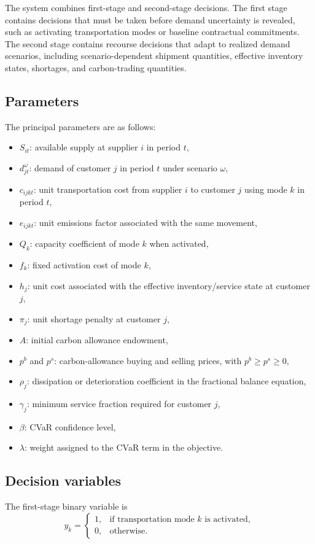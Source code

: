 The system combines first-stage and second-stage decisions. The first stage contains decisions that must be taken before demand uncertainty is revealed, such as activating transportation modes or baseline contractual commitments. The second stage contains recourse decisions that adapt to realized demand scenarios, including scenario-dependent shipment quantities, effective inventory states, shortages, and carbon-trading quantities.

\subsection{Parameters}
The principal parameters are as follows:
\begin{itemize}[leftmargin=1.8em]
    \item $S_{it}$: available supply at supplier $i$ in period $t$,
    \item $d_{jt}^{\omega}$: demand of customer $j$ in period $t$ under scenario $\omega$,
    \item $c_{ijkt}$: unit transportation cost from supplier $i$ to customer $j$ using mode $k$ in period $t$,
    \item $e_{ijkt}$: unit emissions factor associated with the same movement,
    \item $Q_k$: capacity coefficient of mode $k$ when activated,
    \item $f_k$: fixed activation cost of mode $k$,
    \item $h_j$: unit cost associated with the effective inventory/service state at customer $j$,
    \item $\pi_j$: unit shortage penalty at customer $j$,
    \item $A$: initial carbon allowance endowment,
    \item $p^b$ and $p^s$: carbon-allowance buying and selling prices, with $p^b\ge p^s\ge 0$,
    \item $\rho_j$: dissipation or deterioration coefficient in the fractional balance equation,
    \item $\gamma_j$: minimum service fraction required for customer $j$,
    \item $\beta$: CVaR confidence level,
    \item $\lambda$: weight assigned to the CVaR term in the objective.
\end{itemize}

\subsection{Decision variables}
The first-stage binary variable is
\begin{equation}
 y_k=\begin{cases}
 1,&\text{if transportation mode }k\text{ is activated},\\
 0,&\text{otherwise.}
 \end{cases}
\end{equation}

